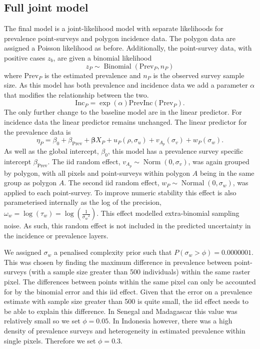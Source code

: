 \documentclass{statsoc}
\begin{document}
\subsection*{Full joint model}

The final model is a joint-likelihood model with separate likelihoods for prevalence point-surveys and polygon incidence data.
The polygon data are assigned a Poisson likelihood as before.
Additionally, the point-survey data, with positive cases $z_b$, are given a binomial likelihood
$$z_P \sim \operatorname{Binomial}(\mathrm{Prev}_P, n_P) $$
where $\mathrm{Prev}_P$ is the estimated prevalence and $n_P$ is the observed survey sample size. 
As this model has both prevalence and incidence data we add a parameter $\alpha$ that modifies the relationship between the two.
$$\mathrm{Inc}_P = \exp(\alpha)\mathrm{PrevInc}(\mathrm{Prev}_P).$$
The only further change to the baseline model are in the linear predictor.
For incidence data the linear predictor remains unchanged.
The linear predictor for the prevalence data is
$$\eta_P = \beta_0 + \beta_\mathrm{Prev} +  \boldsymbol\beta X_P  + u_P(\rho, \sigma_u) + v_{A_p}(\sigma_v) + w_P(\sigma_w).$$
As well as the global intercept, $\beta_0$, this model has a prevalence survey specific intercept $\beta_\mathrm{Prev}$.
The iid random effect, $v_{A_p} \sim \operatorname{Norm}(0, \sigma_v)$, was again grouped by polygon, with all pixels and point-surveys within polygon $A$ being in the same group as polygon $A$.
The second iid random effect, $w_P \sim \operatorname{Normal}(0, \sigma_w)$, was applied to each point-survey.
To improve numeric stability this effect is also parameterised internally as the log of the precision, $\omega_w = \log(\tau_w) = \log(\frac{1}{{\sigma_w}^2})$.
This effect modelled extra-binomial sampling noise.
As such, this random effect is not included in the predicted uncertainty in the incidence or prevalence layers.


We assigned $\sigma_w$ a penalised complexity prior such that $P(\sigma_w > \phi) = 0.0000001$. 
This was chosen by finding the maximum difference in prevalence between point-surveys (with a sample size greater than 500 individuals) within the same raster pixel.
The differences between points within the same pixel can only be accounted for by the binomial error and this iid effect.
Given that the error on a prevalence estimate with sample size greater than 500 is quite small, the iid effect needs to be able to explain this difference.
In Senegal and Madagascar this value was relatively small so we set $\phi = 0.05$. 
In Indonesia however, there was a high density of prevalence surveys and heterogeneity in estimated prevalence within single pixels.
Therefore we set $\phi = 0.3$.
\end{document}
